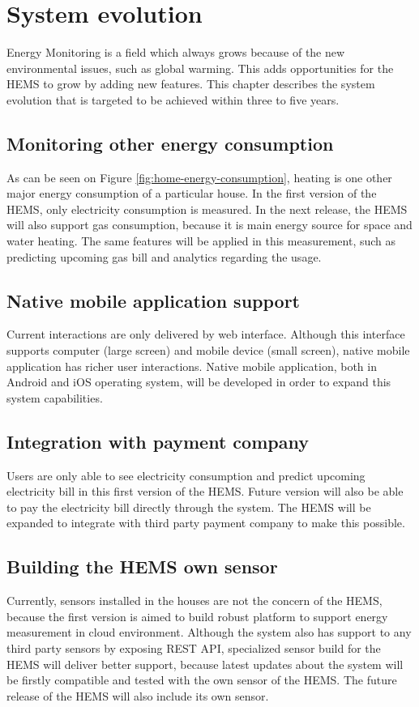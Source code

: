 \chapter{System evolution}
\label{ch:evolution}
Energy Monitoring is a field which always grows because of the new environmental issues, such as global warming. This adds opportunities for the HEMS to grow by adding new features. This chapter describes the system evolution that is targeted to be achieved within three to five years.

\section{Monitoring other energy consumption}
As can be seen on Figure \ref{fig:home-energy-consumption}, heating is one other major energy consumption of a particular house. In the first version of the HEMS, only electricity consumption is measured. In the next release, the HEMS will also support gas consumption, because it is main energy source for space and water heating. The same features will be applied in this measurement, such as predicting upcoming gas bill and analytics regarding the usage.

\section{Native mobile application support}
Current interactions are only delivered by web interface. Although this interface supports computer (large screen) and mobile device (small screen), native mobile application has richer user interactions. Native mobile application, both in Android and iOS operating system, will be developed in order to expand this system capabilities. 

\section{Integration with payment company}
Users are only able to see electricity consumption and predict upcoming electricity bill in this first version of the HEMS. Future version will also be able to pay the electricity bill directly through the system. The HEMS will be expanded to integrate with third party payment company to make this possible.

\section{Building the HEMS own sensor}
Currently, sensors installed in the houses are not the concern of the HEMS, because the first version is aimed to build robust platform to support energy measurement in cloud environment. Although the system also has support to any third party sensors by exposing REST API, specialized sensor build for the HEMS will deliver better support, because latest updates about the system will be firstly compatible and tested with the own sensor of the HEMS. The future release of the HEMS will also include its own sensor.